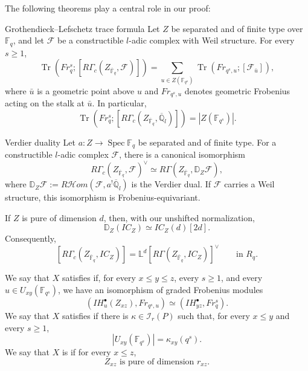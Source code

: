 \documentclass[a4paper]{article}
\newcommand\Fq{{\mathbb{F}_q}}
\newcommand\LL{{\mathbb{L}}}
\newcommand\II{{\mathcal{I}}}
\newcommand\Qlb{{\overline{\mathbb{Q}}_l}}
\newcommand\Fqs{{\mathbb{F}_{q^s}}}
\newcommand\Fqb{{\overline{\mathbb{F}}_q}}
\begin{document}
The following theorems play a central role in our proof:
\begin{theorem}{Grothendieck--Lefschetz trace formula \cite[III.12.1(4)]{KiehlWeissauer2001}}
        Let $Z$ be separated and of finite type over $\Fq$, and let $\mathcal F$ be a constructible $l$-adic complex with Weil structure. For every $s\geq 1$,
        \[
                \operatorname{Tr}\!\left(Fr_q^s;[R\Gamma_c(Z_{\Fqb},\mathcal F)]\right)
                =\sum_{u\in Z(\Fqs)}
                \operatorname{Tr}\!\left(Fr_{q^s,u};[\mathcal F_{\bar u}]\right),
        \]
        where $\bar u$ is a geometric point above $u$ and $Fr_{q^s,u}$ denotes geometric Frobenius acting on the stalk at $\bar u$. In particular,
        \[
                \operatorname{Tr}\!\left(Fr_q^s;[R\Gamma_c(Z_{\Fqb},\Qlb)]\right)
                =|Z(\Fqs)|.
        \]
\end{theorem}

\begin{theorem}{Verdier duality \cite[II.7.3]{KiehlWeissauer2001}}
        Let $a:Z\to\operatorname{Spec}\Fq$ be separated and of finite type. For a constructible $l$-adic complex $\mathcal F$, there is a canonical isomorphism
        \[
                R\Gamma_c(Z_{\Fqb},\mathcal F)^\vee
                \simeq R\Gamma(Z_{\Fqb},\mathbb D_Z\mathcal F),
        \]
        where $\mathbb D_Z\mathcal F:=R\mathcal{H}om(\mathcal F,a^!\Qlb)$ is the Verdier dual. If $\mathcal F$ carries a Weil structure, this isomorphism is Frobenius-equivariant.

        If $Z$ is pure of dimension $d$, then, with our unshifted normalization,
        \[
                \mathbb D_Z(IC_Z)\simeq IC_Z(d)[2d].
        \]
        Consequently,
        \[
                [R\Gamma_c(Z_{\Fqb},IC_Z)]
                =\LL^d[R\Gamma(Z_{\Fqb},IC_Z)]^\vee
                \qquad\text{in }R_q.
        \]
\end{theorem}

\begin{definition}{}
        We say that $X$ satisfies  if, for every $x\leq y\leq z$, every $s\geq 1$, and every $u\in U_{xy}(\Fqs)$, we have an isomorphism of graded Frobenius modules
        \[
                \left(IH_u^\bullet(Z_{xz}),Fr_{q^s,u}\right)
                \simeq
                \left(IH_{yz}^\bullet,Fr_q^s\right).
        \]
        We say that $X$ satisfies  if there is $\kappa\in\II_r(P)$ such that, for every $x\leq y$ and every $s\geq 1$,
        \[
                |U_{xy}(\Fqs)|=\kappa_{xy}(q^s).
        \]
        We say that $X$ is  if for every $x\leq z$,
        \[
                Z_{xz}\text{ is pure of dimension }r_{xz}.
        \]
\end{definition}
\end{document}
